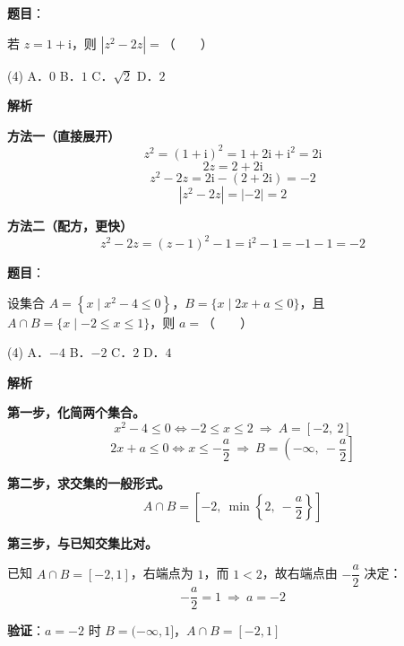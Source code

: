 \begin{answer}

\textbf{题目}：

若 $z=1+\mathrm i$，则 $\left|z^{2}-2z\right|=$\mbox{（　　）}

\begin{gkopts}(4)
\task A．$0$
\task B．$1$
\task C．$\sqrt2$
\task D．$2$
\end{gkopts}

\textbf{解析}

\textbf{方法一（直接展开）}
\nopagebreak[4]
\[z^{2}=(1+\mathrm i)^{2}=1+2\mathrm i+\mathrm i^{2}=2\mathrm i\]
\nopagebreak[4]
\[2z=2+2\mathrm i\]
\nopagebreak[4]
\[z^{2}-2z=2\mathrm i-(2+2\mathrm i)=-2\]
\nopagebreak[4]
\[\left|z^{2}-2z\right|=|-2|=2\]

\textbf{方法二（配方，更快）}
\nopagebreak[4]
\[z^{2}-2z=(z-1)^{2}-1=\mathrm i^{2}-1=-1-1=-2\]


\par\medskip

\end{answer}
\begin{answer}

\textbf{题目}：

设集合 $A=\left\{x\mid x^{2}-4\le0\right\}$，$B=\{x\mid2x+a\le0\}$，且 $A\cap B=\{x\mid-2\le x\le1\}$，则 $a=$\mbox{（　　）}

\begin{gkopts}(4)
\task A．$-4$
\task B．$-2$
\task C．$2$
\task D．$4$
\end{gkopts}

\textbf{解析}

\textbf{第一步，化简两个集合。}
\nopagebreak[4]
\[x^{2}-4\le0\iff-2\le x\le2\ \Longrightarrow\ A=[-2,\ 2]\]
\nopagebreak[4]
\[2x+a\le0\iff x\le-\frac a2\ \Longrightarrow\ B=\left(-\infty,\ -\frac a2\right]\]

\textbf{第二步，求交集的一般形式。}
\nopagebreak[4]
\[A\cap B=\left[-2,\ \min\left\{2,\ -\frac a2\right\}\right]\]

\textbf{第三步，与已知交集比对。}

已知 $A\cap B=[-2,1]$，右端点为 $1$，而 $1<2$，故右端点由 $-\dfrac a2$ 决定：
\nopagebreak[4]
\[-\frac a2=1\ \Longrightarrow\ a=-2\]

\textbf{验证}：$a=-2$ 时 $B=(-\infty,1]$，$A\cap B=[-2,1]$ 


\par\medskip

\end{answer}
